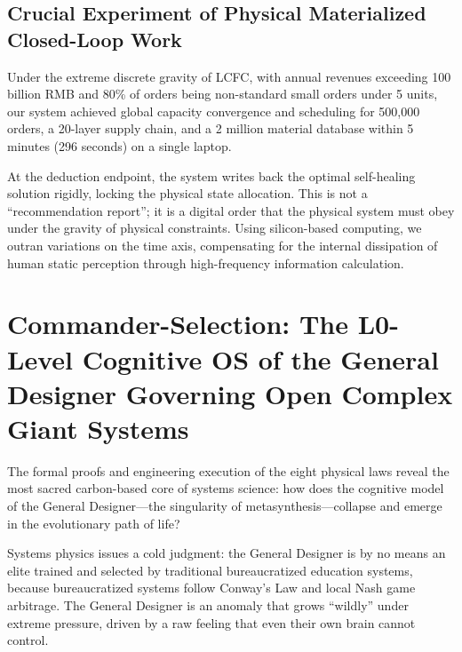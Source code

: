 \documentclass{article}
\begin{document}
\subsection{Crucial Experiment of Physical Materialized Closed-Loop Work}
Under the extreme discrete gravity of LCFC, with annual revenues exceeding 100 billion RMB and 80\% of orders being non-standard small orders under 5 units, our system achieved global capacity convergence and scheduling for 500,000 orders, a 20-layer supply chain, and a 2 million material database within 5 minutes (296 seconds) on a single laptop.

At the deduction endpoint, the system writes back the optimal self-healing solution rigidly, locking the physical state allocation. This is not a ``recommendation report''; it is a digital order that the physical system must obey under the gravity of physical constraints. Using silicon-based computing, we outran variations on the time axis, compensating for the internal dissipation of human static perception through high-frequency information calculation.

\section{Commander-Selection: The L0-Level Cognitive OS of the General Designer Governing Open Complex Giant Systems}
\label{commander-selection}

The formal proofs and engineering execution of the eight physical laws reveal the most sacred carbon-based core of systems science: how does the cognitive model of the General Designer---the singularity of metasynthesis---collapse and emerge in the evolutionary path of life?

Systems physics issues a cold judgment: the General Designer is by no means an elite trained and selected by traditional bureaucratized education systems, because bureaucratized systems follow Conway's Law and local Nash game arbitrage. The General Designer is an anomaly that grows ``wildly'' under extreme pressure, driven by a raw feeling that even their own brain cannot control.
\end{document}

